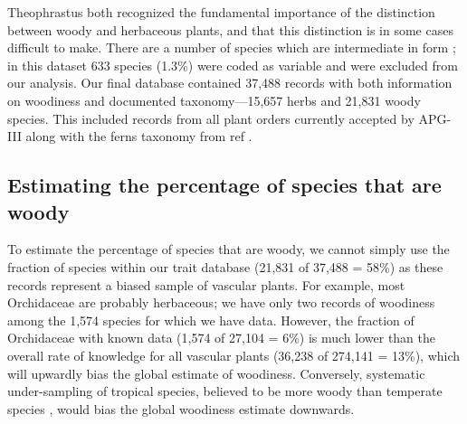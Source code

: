 \documentclass[12pt]{article}
\begin{document}
Theophrastus both recognized the fundamental importance of the
distinction between woody and herbaceous plants, and that this
distinction is in some cases difficult to make.  There are a number of
species which are intermediate in form \citep{beaulieuHiddenRates}; in
this dataset 633 species (1.3\%) were coded as variable and were
excluded from our analysis.
%
Our final database contained 37,488 records with both information on
woodiness and documented taxonomy---15,657 herbs and 21,831 woody
species.  This included records from all plant orders currently
accepted by APG-III \citep{APG3} along with the ferns taxonomy from
ref \cite{apweb}.


\subsection{Estimating the percentage of species that are woody}

To estimate the percentage of species that are woody, we cannot simply
use the fraction of species within our trait database (21,831 of
37,488 = 58\%) as these records represent a biased sample of vascular
plants.
For example, most Orchidaceae are probably herbaceous; we have only
two records of woodiness among the 1,574 species for which we have
data.
However, the fraction of Orchidaceae with known data (1,574 of 27,104
= 6\%)
is much lower than the overall rate of knowledge for all vascular
plants (36,238 of 274,141 = 13\%), which will upwardly bias the global
estimate of woodiness.
%
Conversely, systematic under-sampling of tropical species, believed to
be more woody than temperate species \citep{Molesheihgt}, would bias
the global woodiness estimate downwards.
\end{document}
